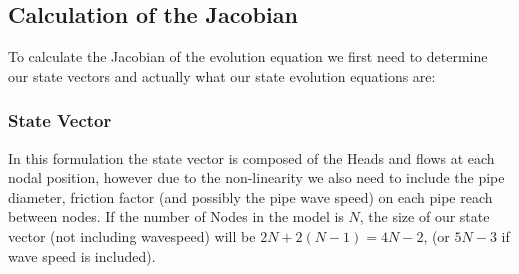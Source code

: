 \documentclass[]{article}
\begin{document}
\subsection{Calculation of the Jacobian}
To calculate the Jacobian of the evolution equation we first need to determine our state vectors and actually what our state evolution equations are:

\subsubsection{State Vector}
In this formulation the state vector is composed of the Heads and flows at each nodal position, however due to the non-linearity we also need to include the pipe diameter, friction factor (and possibly the pipe wave speed) on each pipe reach between nodes.  
If the number of Nodes in the model is $N$, the size of our state vector (not including wavespeed) will be $2N + 2(N-1) = 4N -2$, (or $5N-3$ if wave speed is included).
\end{document}
